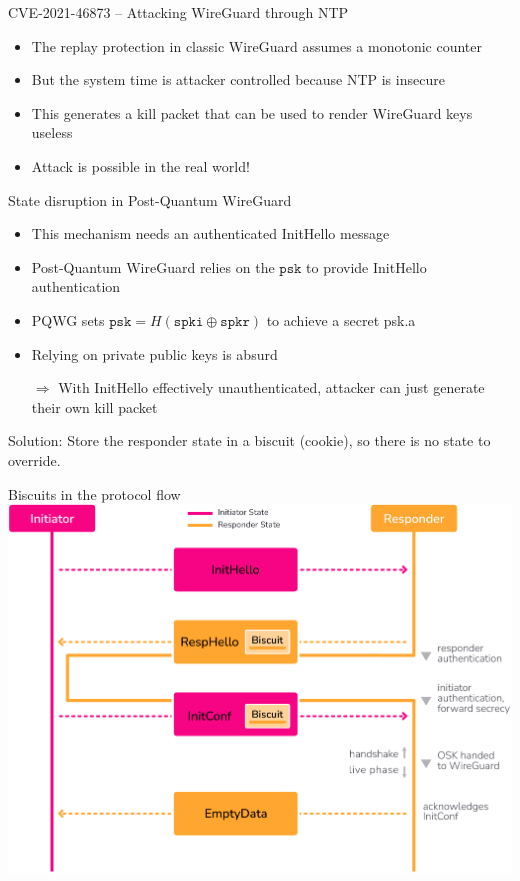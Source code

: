 \begin{frame}{CVE-2021-46873 – Attacking WireGuard through NTP}
\begin{itemize}
  \item The replay protection in classic WireGuard assumes a monotonic counter
  \item But the system time is attacker controlled because NTP is insecure
  \item This generates a kill packet that can be used to render WireGuard keys useless
  \item Attack is possible in the real world!
\end{itemize}
\end{frame}

\begin{frame}{State disruption in Post-Quantum WireGuard}
\begin{itemize}
  \item This mechanism needs an authenticated InitHello message
  \item Post-Quantum WireGuard relies on the $\texttt{psk}$ to provide InitHello authentication
  \item PQWG sets $\texttt{psk} = H(\texttt{spki} \oplus \texttt{spkr})$ to achieve a secret psk.a
  \item Relying on private public keys is absurd
  \item[$\Rightarrow$] With InitHello effectively unauthenticated, attacker can just generate their own kill packet
\end{itemize}
  Solution: Store the responder state in a biscuit (cookie), so there is no state to override.
\end{frame}

\begin{frame}{Biscuits in the protocol flow}
  \includegraphics[height=.80\textheight]{graphics/rosenpass-wp-key-exchange-protocol-rgb.pdf}
\end{frame}

